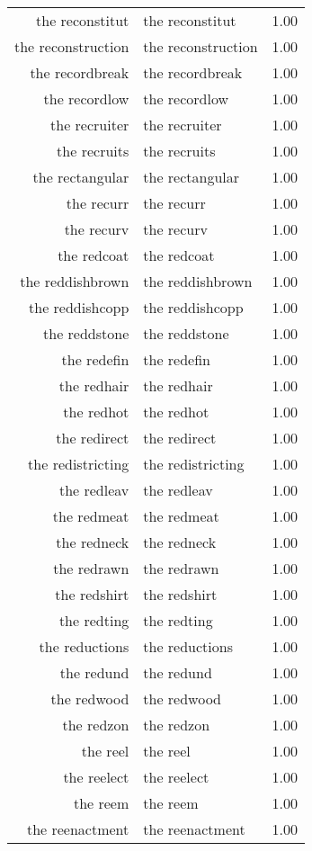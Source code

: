 \begin{table}[ht]
\begin{tabular}{rlr}
  the reconstitut & the reconstitut & 1.00 \\ 
  the reconstruction & the reconstruction & 1.00 \\ 
  the recordbreak & the recordbreak & 1.00 \\ 
  the recordlow & the recordlow & 1.00 \\ 
  the recruiter & the recruiter & 1.00 \\ 
  the recruits & the recruits & 1.00 \\ 
  the rectangular & the rectangular & 1.00 \\ 
  the recurr & the recurr & 1.00 \\ 
  the recurv & the recurv & 1.00 \\ 
  the redcoat & the redcoat & 1.00 \\ 
  the reddishbrown & the reddishbrown & 1.00 \\ 
  the reddishcopp & the reddishcopp & 1.00 \\ 
  the reddstone & the reddstone & 1.00 \\ 
  the redefin & the redefin & 1.00 \\ 
  the redhair & the redhair & 1.00 \\ 
  the redhot & the redhot & 1.00 \\ 
  the redirect & the redirect & 1.00 \\ 
  the redistricting & the redistricting & 1.00 \\ 
  the redleav & the redleav & 1.00 \\ 
  the redmeat & the redmeat & 1.00 \\ 
  the redneck & the redneck & 1.00 \\ 
  the redrawn & the redrawn & 1.00 \\ 
  the redshirt & the redshirt & 1.00 \\ 
  the redting & the redting & 1.00 \\ 
  the reductions & the reductions & 1.00 \\ 
  the redund & the redund & 1.00 \\ 
  the redwood & the redwood & 1.00 \\ 
  the redzon & the redzon & 1.00 \\ 
  the reel & the reel & 1.00 \\ 
  the reelect & the reelect & 1.00 \\ 
  the reem & the reem & 1.00 \\ 
  the reenactment & the reenactment & 1.00 \\ 

\end{tabular}
\end{table}
